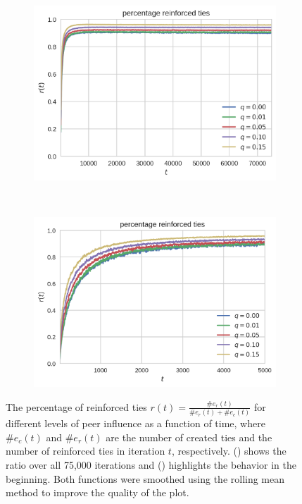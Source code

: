 \begin{figure}[htbp]
\centering
\begin{subfigure}[b]{0.485\textwidth}
  \includegraphics[width=\textwidth]{figures/percentage-reinforced-ties-full}
  \caption{}
  \label{fig:percentage-reinforced-ties-full}
\end{subfigure}
~
\begin{subfigure}[b]{0.485\textwidth}
  \includegraphics[width=\textwidth]{figures/percentage-reinforced-ties-beginning}
  \caption{}
  \label{fig:percentage-reinforced-ties-beginning}
\end{subfigure}

\caption[Percentage of reinforced ties as function of time]{The percentage of reinforced ties \( r(t) = \frac{\#e_{r}(t)}{\#e_{r}(t) + \#e_{c}(t)} \) for different levels of peer influence as a function of time, where \( \#e_{c}(t) \) and \( \#e_{r}(t) \) are the number of created ties and the number of reinforced ties in iteration \( t \), respectively. () shows the ratio over all 75,000 iterations and () highlights the behavior in the beginning. Both functions were smoothed using the rolling mean method to improve the quality of the plot.}
\label{fig:percentage-reinforced-ties}
\end{figure}


